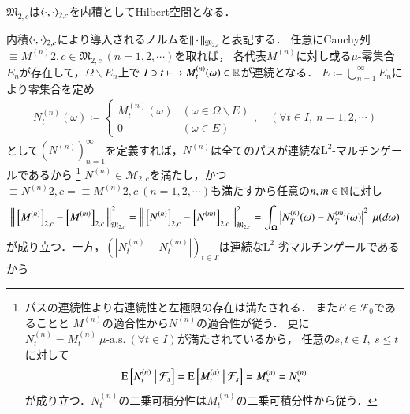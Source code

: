 	\begin{screen}
		\begin{prp}
			$\mathfrak{M}_{2,c}$は$\inprod<\cdot,\cdot>_{2,c}$を内積としてHilbert空間となる．
			\label{prp:M_2_c_hilbert}
		\end{prp}
	\end{screen}
			
	\begin{prf}
			内積$\inprod<\cdot,\cdot>_{2,c}$により導入されるノルムを$\left\|\, \cdot\, \right\|_{\mathfrak{M}_{2,c}}$と表記する．
			任意にCauchy列$\equiv{M^{(n)}}{2,c} \in \mathfrak{M}_{2,c}\ (n=1,2,\cdots)$を取れば，
			各代表$M^{(n)}$に対し或る$\mu$-零集合$E_n$が存在して，$\Omega \backslash E_n$上で
			$I \ni t \longmapsto M^{(n)}_t(\omega) \in \mathbb{R}$が連続となる．
			$E \coloneqq \bigcup_{n=1}^{\infty} E_n$により零集合を定め
			\begin{align}
				N^{(n)}_t(\omega) \coloneqq
				\begin{cases}
					M^{(n)}_t(\omega) & (\omega \in \Omega \backslash E) \\
					0 & (\omega \in E)
				\end{cases}
				,\quad (\forall t \in I,\ n = 1,2,\cdots)
			\end{align}
		として$\left( N^{(n)} \right)_{n=1}^{\infty}$を定義すれば，$N^{(n)}$は全てのパスが連続な$\mathrm{L}^2$-マルチンゲールであるから
		\footnote{
			パスの連続性より右連続性と左極限の存在は満たされる．
			また$E \in \mathcal{F}_0$であることと
			$M^{(n)}$の適合性から$N^{(n)}$の適合性が従う．
			更に$N^{(n)}_t = M^{(n)}_t\ \mbox{$\mu$-a.s.}\ (\forall t \in I)$が満たされているから，
			任意の$s,t \in I,\ s \leq t$に対して
			\begin{align}
				\operatorname{E} \left[ N^{(n)}_t \ \middle|\ \mathcal{F}_s \right] = \operatorname{E} \left[ M^{(n)}_t \ \middle|\ \mathcal{F}_s \right] = M^{(n)}_s = N^{(n)}_s
			\end{align}
			が成り立つ．$N^{(n)}_t$の二乗可積分性は$M^{(n)}_t$の二乗可積分性から従う．
		}
		$N^{(n)} \in \mathcal{M}_{2,c}$を満たし，かつ
		$\equiv{N^{(n)}}{2,c} = \equiv{M^{(n)}}{2,c}\ (n=1,2,\cdots)$も満たすから任意の$n,m \in \mathbb{N}$に対し
		\begin{align}
			\left\|\, \left[M^{(n)}\right]_{2,c} - \left[M^{(m)}\right]_{2,c}\, \right\|_{\mathfrak{M}_{2,c}}^2 
			= \left\|\, \left[N^{(n)}\right]_{2,c} - \left[N^{(m)}\right]_{2,c}\, \right\|_{\mathfrak{M}_{2,c}}^2
			= \int_{\Omega} \left| N^{(n)}_T(\omega) - N^{(m)}_T(\omega) \right|^2\ \mu(d\omega)
			\label{eq:prp_M_2_c_hilbert_1}
		\end{align}
		が成り立つ．一方，$\left(\left|N^{(n)}_t - N^{(m)}_t\right|\right)_{t \in T}$は連続な$\mathrm{L}^2$-劣マルチンゲールであるから

\end{prf}
